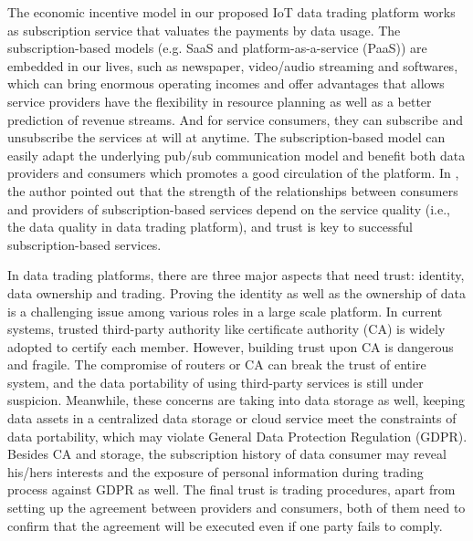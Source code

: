 \documentclass[conference]{IEEEtran}
\begin{document}
The economic incentive model in our proposed IoT data trading platform works as subscription service that valuates the payments by data usage. The subscription-based models (e.g. SaaS and platform-as-a-service (PaaS)) are embedded in our lives, such as newspaper, video/audio streaming and softwares, which can bring enormous operating incomes and offer advantages that allows service providers have the flexibility in resource planning as well as a better prediction of revenue streams. And for service consumers, they can subscribe and unsubscribe the services at will at anytime. The subscription-based model can easily adapt the underlying pub/sub communication model and benefit both data providers and consumers which promotes a good circulation of the platform. In \cite{SaaS}, the author pointed out that the strength of the relationships between consumers and providers of subscription-based services depend on the service quality (i.e., the data quality in data trading platform), and trust is key to successful subscription-based services.

In data trading platforms, there are three major aspects that need trust: identity, data ownership and trading. Proving the identity as well as the ownership of data is a challenging issue among various roles in a large scale platform. In current systems, trusted third-party authority like certificate authority (CA) is widely adopted to certify each member. However, building trust upon CA is dangerous and fragile. The compromise of routers or CA can break the trust of entire system, and the data portability of using third-party services is still under suspicion. Meanwhile, these concerns are taking into data storage as well, keeping data assets in a centralized data storage or cloud service meet the constraints of data portability, which may violate General Data Protection Regulation (GDPR)\cite{GDPR}. Besides CA and storage, the subscription history of data consumer may reveal his/hers interests and the exposure of personal information during trading process against GDPR as well. The final trust is trading procedures, apart from setting up the agreement between providers and consumers, both of them need to confirm that the agreement will be executed even if one party fails to comply.
\end{document}
